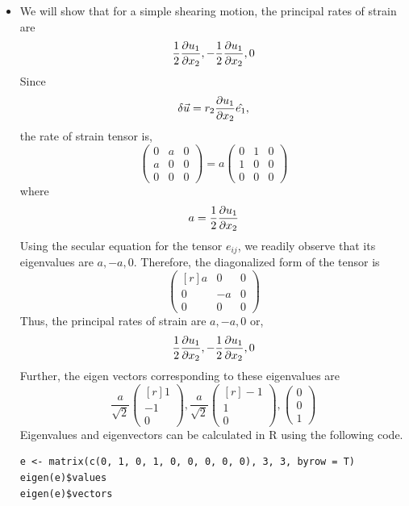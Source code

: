 \begin{itemize}
\item We will show that for a simple shearing motion, the principal rates of strain are 
\[
\frac{1}{2}\frac{\partial{u_1}}{\partial{x_2}}, -\frac{1}{2}\frac{\partial{u_1}}{\partial{x_2}}, 0
\]
Since
\[
\delta\vec{u} = r_2\frac{\partial{u_1}}{\partial{x_2}}\hat{e_{1}},
\]
the rate of strain tensor is,
\[
\begin{pmatrix}
0 & a & 0 \\
a & 0 & 0 \\
0 & 0 & 0
\end{pmatrix} =
a\begin{pmatrix}
0 & 1 & 0 \\
1 & 0 & 0 \\
0 & 0 & 0
\end{pmatrix}
\]
where
\[
a = \frac{1}{2}\frac{\partial{u_1}}{\partial{x_2}}
\]
Using the secular equation for the tensor $e_{ij}$, we readily observe that its eigenvalues are $a, -a, 0$. Therefore, the diagonalized form of the tensor is
\[
\begin{pmatrix*}[r]
a & 0 & 0 \\
0 & -a & 0 \\
0 & 0 & 0
\end{pmatrix*}
\]
Thus, the principal rates of strain are $a, -a, 0$ or,
\[
\frac{1}{2}\frac{\partial{u_1}}{\partial{x_2}}, -\frac{1}{2}\frac{\partial{u_1}}{\partial{x_2}}, 0
\]
Further, the eigen vectors corresponding to these eigenvalues are
\[
\frac{a}{\sqrt{2}}\begin{pmatrix*}[r] 1 \\ -1 \\ 0 \end{pmatrix*}, 
\frac{a}{\sqrt{2}}\begin{pmatrix*}[r] -1 \\ 1 \\ 0 \end{pmatrix*}, 
\begin{pmatrix}0 \\ 0 \\ 1 \end{pmatrix}
\]
Eigenvalues and eigenvectors can be calculated in R using the following code.
\begin{verbatim}
e <- matrix(c(0, 1, 0, 1, 0, 0, 0, 0, 0), 3, 3, byrow = T)
eigen(e)$values
eigen(e)$vectors
\end{verbatim}


\end{itemize}
